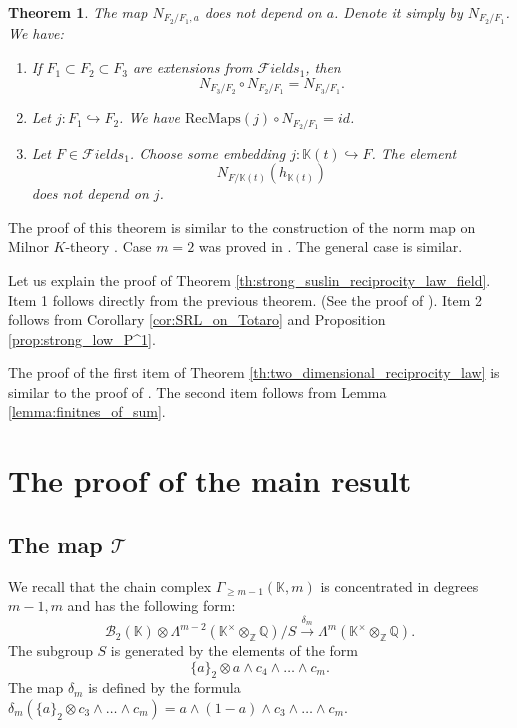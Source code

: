\documentclass[12pt]{extarticle}
\newtheorem{theorem}{Theorem}[section]
\def\mb{\mathbb}
\def\mc{\mathcal}
\def\k{\mb K}
\def\Z{\mb Z}
\def\Q{\mb Q}
\def\emb{\hookrightarrow}
\def\wdw{\wedge\dots\wedge}
\def\F{{\mc Fields}}
\def\B{{\mc B}}
\newcommand{\SRL}{\mathrm{RecMaps}}
\begin{document}
\begin{theorem}
    The map $N_{F_2/F_1, a}$ does not depend on $a$. Denote it simply by $N_{F_2/F_1}$. We have: \begin{enumerate}
        \item If $F_1\subset F_2\subset F_3$ are extensions from $\F_1$, then $$N_{F_3/F_2}\circ N_{F_2/F_1}=N_{F_3/F_1}.$$
        \item Let $j\colon F_1\emb F_2$. We have $\SRL(j)\circ N_{F_2/F_1}=id$.
        \item Let $F\in\F_1$. Choose some embedding $j\colon \k(t)\emb F$. The element $$N_{F/\k(t)}(h_{\k(t)})$$ does not depend on $j$.
    \end{enumerate}
\end{theorem}

The proof of this theorem is similar to the construction of the norm map on Milnor $K$-theory \cite{suslin1979reciprocity}. Case $m=2$ was proved in \cite[Theorem 1.14]{bolbachan_2023_chow}. The general case is similar.

Let us explain the proof of Theorem \ref{th:strong_suslin_reciprocity_law_field}. Item 1 follows directly from the previous theorem. (See the proof of \cite[Theorem 1.8.]{bolbachan_2023_chow}). Item 2 follows from Corollary \ref{cor:SRL_on_Totaro} and Proposition \ref{prop:strong_low_P^1}.

The proof of the first item of Theorem \ref{th:two_dimensional_reciprocity_law} is similar to the proof of \cite[Corollary 1.13]{bolbachan_2023_chow}. The second item follows from Lemma \ref{lemma:finitnes_of_sum}.



\section{The proof of the main result}
\label{sec:Lambda_and_polylogarithms}


\subsection{The map $\mc T$}
\label{sec:Totaro_map}
We recall that the chain complex $\Gamma_{\geq m-1}(\k,m)$ is concentrated in degrees $m-1,m$ and has the following form:
$$\B_2(\k)\otimes\Lambda^{m-2}(\k^\times\otimes_\Z\Q)/S\xrightarrow{\delta_m} \Lambda^m(\k^\times\otimes_\Z\Q).$$
The subgroup $S$ is generated by the elements of the form $$\{a\}_2\otimes a\wedge c_4\wdw c_m.$$ 
The map $\delta_m$ is defined by the formula $\delta_m(\{a\}_2\otimes c_3\wdw c_m)=a\wedge(1-a)\wedge c_3\wdw c_m$.
\end{document}

